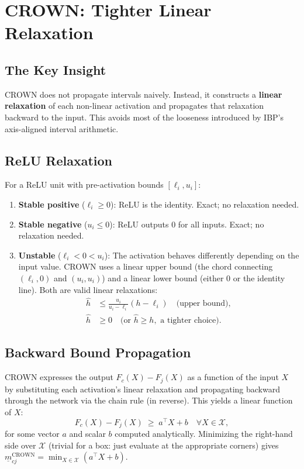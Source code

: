 \documentclass[11pt, a4paper]{article}
\theoremstyle{definition}
\theoremstyle{plain}
\newcommand{\mbm}[1]{\underline{m}_{#1}}
\begin{document}
\section{CROWN: Tighter Linear Relaxation}

\subsection{The Key Insight}

CROWN does not propagate intervals naively. Instead, it constructs a
\textbf{linear relaxation} of each non-linear activation and propagates
that relaxation backward to the input. This avoids most of the looseness
introduced by IBP's axis-aligned interval arithmetic.

\subsection{ReLU Relaxation}

For a ReLU unit with pre-activation bounds $[\ell_i, u_i]$:

\begin{enumerate}
  \item \textbf{Stable positive} ($\ell_i \ge 0$): ReLU is the identity.
        Exact; no relaxation needed.
  \item \textbf{Stable negative} ($u_i \le 0$): ReLU outputs 0 for all inputs.
        Exact; no relaxation needed.
  \item \textbf{Unstable} ($\ell_i < 0 < u_i$): The activation behaves
        differently depending on the input value. CROWN uses a linear upper bound
        (the chord connecting $(\ell_i, 0)$ and $(u_i, u_i)$) and a linear lower
        bound (either $0$ or the identity line). Both are valid linear relaxations:
        \begin{align}
          \hat{h} &\le \frac{u_i}{u_i - \ell_i}(h - \ell_i) \quad \text{(upper bound)}, \\
          \hat{h} &\ge 0 \quad \text{(or } \hat{h} \ge h, \text{ a tighter choice)}.
        \end{align}
\end{enumerate}

\subsection{Backward Bound Propagation}

CROWN expresses the output $F_c(X) - F_j(X)$ as a function of the input $X$
by substituting each activation's linear relaxation and propagating backward
through the network via the chain rule (in reverse). This yields a linear
function of $X$:
\[
  F_c(X) - F_j(X) \;\ge\; a^\top X + b \quad \forall X \in \mathcal{X},
\]
for some vector $a$ and scalar $b$ computed analytically. Minimizing the
right-hand side over $\mathcal{X}$ (trivial for a box: just evaluate at the
appropriate corners) gives $\mbm{cj}^{\text{CROWN}} = \min_{X \in \mathcal{X}} (a^\top X + b)$.
\end{document}
